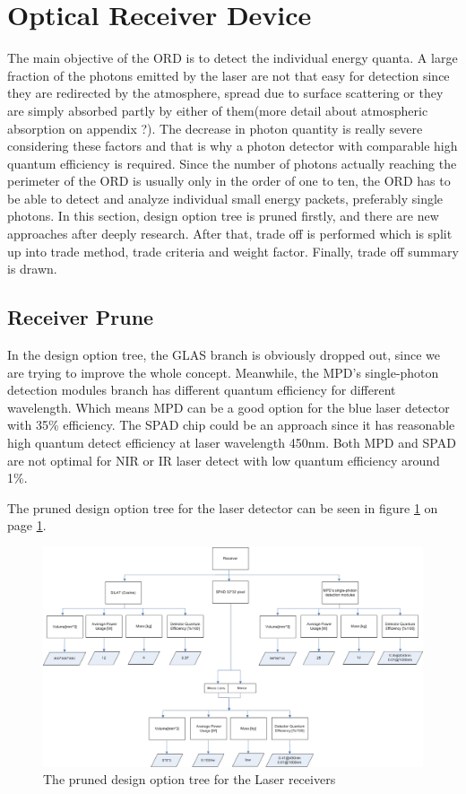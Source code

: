 \section{Optical Receiver Device}
\label{TOORD}
The main objective of the \ac{ORD} is to detect the individual energy quanta. A large fraction of the photons emitted by the \acs{laser} are not that easy for detection since they are redirected by the atmosphere, spread due to surface scattering or they are simply absorbed partly by either of them(more detail about atmospheric absorption on appendix ?). The decrease in photon quantity is really severe considering these factors and that is why a photon detector with comparable high quantum efficiency is required. Since the number of photons actually reaching the perimeter of the \ac{ORD} is usually only in the order of one to ten, the \acs{ORD} has to be able to detect and analyze individual small energy packets, preferably single photons. In this section, design option tree is pruned firstly, and there are new approaches after deeply research. After that, trade off is performed which is split up into trade method, trade criteria and weight factor. Finally, trade off summary is drawn.

\subsection{Receiver Prune}
\label{TOReceiverP}
In the design option tree, the GLAS branch is obviously dropped out, since we are trying to improve the whole concept. Meanwhile, the \ac{MPD}'s single-photon detection modules branch has different quantum efficiency for different wavelength. Which means MPD can be a good option for the blue laser detector with 35\% efficiency. The \ac{SPAD} chip could be an approach since it has reasonable high quantum detect efficiency at laser wavelength 450nm. Both \acs{MPD} and \acs{SPAD} are not optimal for \acs{NIR} or \acs{IR} laser detect with low quantum efficiency around 1\%. 

The pruned design option tree for the laser detector can be seen in figure \ref{fig:PrunedReceiver} on page \ref{fig:PrunedReceiver}.

\begin{figure}
\centering
\includegraphics[width=\textheight, angle=90]{chapters/img/DOTreceiverPruned.jpg}
\caption{The pruned design option tree for the Laser receivers}
\label{fig:PrunedReceiver}
\end{figure}

